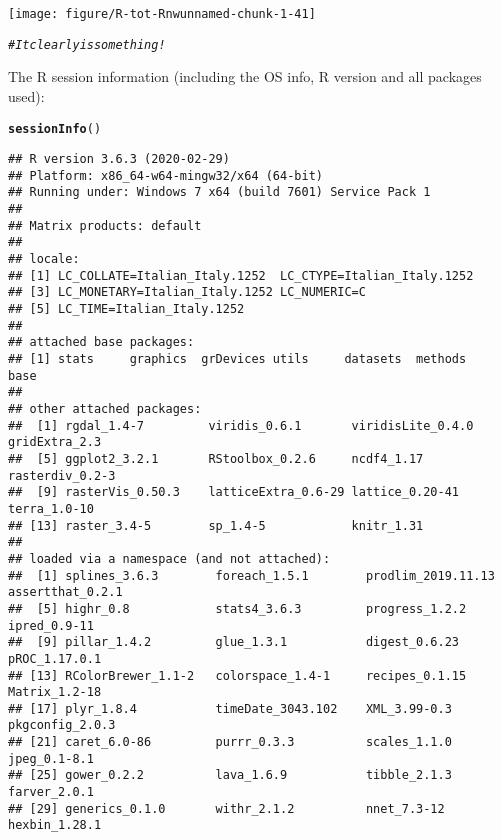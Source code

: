 \documentclass{article}\usepackage[]{graphicx}\usepackage[]{color}
\makeatletter
\newcommand{\hlcom}[1]{\textcolor[rgb]{0.678,0.584,0.686}{\textit{#1}}}%
\newcommand{\hlstd}[1]{\textcolor[rgb]{0.345,0.345,0.345}{#1}}%
\newcommand{\hlkwd}[1]{\textcolor[rgb]{0.737,0.353,0.396}{\textbf{#1}}}%
\newenvironment{kframe}{%
 \def\at@end@of@kframe{}%
 \ifinner\ifhmode%
  \def\at@end@of@kframe{\end{minipage}}%
  \begin{minipage}{\columnwidth}%
 \fi\fi%
 \def\FrameCommand##1{\hskip\@totalleftmargin \hskip-\fboxsep
 \colorbox{shadecolor}{##1}\hskip-\fboxsep
     \hskip-\linewidth \hskip-\@totalleftmargin \hskip\columnwidth}%
 \MakeFramed {\advance\hsize-\width
   \@totalleftmargin\z@ \linewidth\hsize
   \@setminipage}}%
 {\par\unskip\endMakeFramed%
 \at@end@of@kframe}
\newenvironment{knitrout}{}{} %
\makeatother
\begin{document}
\begin{knitrout}
{\centering \texttt{[image: figure/R-tot-Rnwunnamed-chunk-1-41]} 

}


\begin{kframe}\begin{alltt}
\hlcom{# It clearly is something!}
\end{alltt}
\end{kframe}
\end{knitrout}


The R session information (including the OS info, R version and all
packages used):

\begin{knitrout}
\color{fgcolor}\begin{kframe}
\begin{alltt}
\hlkwd{sessionInfo}\hlstd{()}
\end{alltt}
\begin{verbatim}
## R version 3.6.3 (2020-02-29)
## Platform: x86_64-w64-mingw32/x64 (64-bit)
## Running under: Windows 7 x64 (build 7601) Service Pack 1
## 
## Matrix products: default
## 
## locale:
## [1] LC_COLLATE=Italian_Italy.1252  LC_CTYPE=Italian_Italy.1252   
## [3] LC_MONETARY=Italian_Italy.1252 LC_NUMERIC=C                  
## [5] LC_TIME=Italian_Italy.1252    
## 
## attached base packages:
## [1] stats     graphics  grDevices utils     datasets  methods   base     
## 
## other attached packages:
##  [1] rgdal_1.4-7         viridis_0.6.1       viridisLite_0.4.0   gridExtra_2.3      
##  [5] ggplot2_3.2.1       RStoolbox_0.2.6     ncdf4_1.17          rasterdiv_0.2-3    
##  [9] rasterVis_0.50.3    latticeExtra_0.6-29 lattice_0.20-41     terra_1.0-10       
## [13] raster_3.4-5        sp_1.4-5            knitr_1.31         
## 
## loaded via a namespace (and not attached):
##  [1] splines_3.6.3        foreach_1.5.1        prodlim_2019.11.13   assertthat_0.2.1    
##  [5] highr_0.8            stats4_3.6.3         progress_1.2.2       ipred_0.9-11        
##  [9] pillar_1.4.2         glue_1.3.1           digest_0.6.23        pROC_1.17.0.1       
## [13] RColorBrewer_1.1-2   colorspace_1.4-1     recipes_0.1.15       Matrix_1.2-18       
## [17] plyr_1.8.4           timeDate_3043.102    XML_3.99-0.3         pkgconfig_2.0.3     
## [21] caret_6.0-86         purrr_0.3.3          scales_1.1.0         jpeg_0.1-8.1        
## [25] gower_0.2.2          lava_1.6.9           tibble_2.1.3         farver_2.0.1        
## [29] generics_0.1.0       withr_2.1.2          nnet_7.3-12          hexbin_1.28.1       

\end{verbatim}
\end{kframe}
\end{knitrout}
\end{document}
